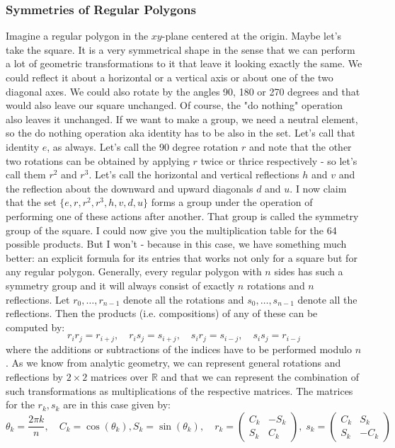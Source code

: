 \subsubsection{Symmetries of Regular Polygons}
Imagine a regular polygon in the $xy$-plane centered at the origin. Maybe let's take the square. It is a very symmetrical shape in the sense that we can perform a lot of geometric transformations to it that leave it looking exactly the same. We could reflect it about a horizontal or a vertical axis or about one of the two diagonal axes. We could also rotate by the angles 90, 180 or 270 degrees and that would also leave our square unchanged. Of course, the "do nothing" operation also leaves it unchanged. If we want to make a group, we need a neutral element, so the do nothing operation aka identity has to be also in the set. Let's call that identity $e$, as always. Let's call the 90 degree rotation $r$ and note that the other two rotations can be obtained by applying $r$ twice or thrice respectively - so let's call them $r^2$ and $r^3$. Let's call the horizontal and vertical reflections $h$ and $v$ and the reflection about the downward and upward diagonals $d$ and $u$. I now claim that the set $\{ e,r,r^2,r^3,h,v,d,u \}$ forms a group under the operation of performing one of these actions after another. That group is called the symmetry group of the square. I could now give you the multiplication table for the 64 possible products. But I won't - because in this case, we have something much better: an explicit formula for its entries that works not only for a square but for any regular polygon. Generally, every regular polygon with $n$ sides has such a symmetry group and it will always consist of exactly $n$ rotations and $n$ reflections. Let $r_0,\ldots,r_{n-1}$ denote all the rotations and $s_0, \ldots,s_{n-1}$ denote all the reflections. Then the products (i.e. compositions) of any of these can be computed by:
\begin{equation}
r_i r_j = r_{i+j}, \quad
r_i s_j = s_{i+j}, \quad
s_i r_j = s_{i-j}, \quad
s_i s_j = r_{i-j}
\end{equation}	
where the additions or subtractions of the indices have to be performed modulo $n$. As we know from analytic geometry, we can represent general rotations and reflections by $2 \times 2$ matrices over $\mathbb{R}$ and that we can represent the combination of such transformations as multiplications of the respective matrices. The matrices for the $r_k, s_k$ are in this case given by:
\begin{equation}
\label{Eq:PolygonSymmetries}
\theta_k =\frac{2 \pi k}{n},  \quad
C_k = \cos(\theta_k), S_k = \sin(\theta_k), \quad	
r_k = \begin{pmatrix}  C_k & -S_k \\  S_k  &  C_k  \end{pmatrix}, \;
s_k = \begin{pmatrix}  C_k &  S_k \\  S_k  & -C_k  \end{pmatrix} \quad
\end{equation}	
